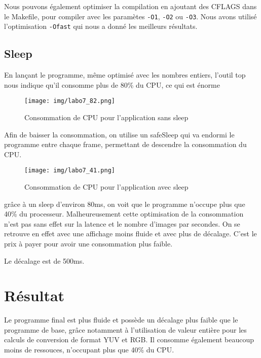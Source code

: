 Nous pouvons également optimiser la compilation en ajoutant des CFLAGS dans le Makefile, pour compiler avec les paramètes \texttt{-O1}, \texttt{-O2} ou \texttt{-O3}. Nous avons utilisé l'optimisation \texttt{-Ofast} qui nous a donné les meilleurs résultats. 

\newpage

\subsection{Sleep}
En lançant le programme, même optimisé avec les nombres entiers, l'outil top nous indique qu'il consomme plus de 80\% du CPU, ce qui est énorme

\begin{figure}[h]
  \centering
    \texttt{[image: img/labo7\_82.png]}
  \caption{Consommation de CPU pour l'application sans sleep}
  \label{labo7_82}
\end{figure}

Afin de baisser la consommation, on utilise un safeSleep qui va endormi le programme entre chaque frame, permettant de descendre la consommation du CPU.

\begin{figure}[h]
  \centering
    \texttt{[image: img/labo7\_41.png]}
  \caption{Consommation de CPU pour l'application avec sleep}
  \label{labo7_41}
\end{figure}

grâce à un sleep d'environ 80ms, on voit que le programme n'occupe plus que 40\% du processeur. Malheureusement cette optimisation de la consommation n'est pas sans effet sur la latence et le nombre d'images par secondes. On se retrouve en effet avec une affichage moins fluide et avec plus de décalage. C'est le prix à payer pour avoir une consommation plus faible. 

Le décalage est de 500ms.

\section{Résultat}

Le programme final est plus fluide et possède un décalage plus faible que le programme de base, grâce notamment à l'utilisation de valeur entière pour les calculs de conversion de format YUV et RGB. Il consomme également beaucoup moins de ressouces, n'occupant plus que 40\% du CPU.



